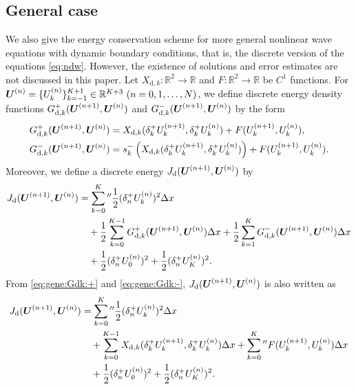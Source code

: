 \documentclass[dvipdfmx-if-dvi,autodetect-engine,ja=standard]{amsart}
\numberwithin{equation}{section} %
\def\vect#1{\mbox{\boldmath $#1$}} %
\begin{document}
\subsection{General case}
We also give the energy conservation scheme
for more general nonlinear wave equations
with dynamic boundary conditions,
that is, the discrete version of the equations \eqref{eq:ndw}.
However, the existence of solutions and
error estimates are not discussed in this paper.
Let
$X_{\mathrm{d},k}: \mathbb{R}^2 \to \mathbb{R}$
and
$F: \mathbb{R}^2 \to \mathbb{R}$
be $C^1$ functions.
For
$\vect{U}^{(n)} = \{ U_k^{(n)} \}_{k=-1}^{K+1} \in \mathbb{R}^{K+3} \ (n=0,1,\ldots,N)$,
we define
discrete energy density functions
$G_{\mathrm{d},k}^+ (\vect{U}^{(n+1)}, \vect{U}^{(n)})$
and
$G_{\mathrm{d},k}^- (\vect{U}^{(n+1)}, \vect{U}^{(n)})$
by the form
\begin{align}\label{eq:gene:Gdk:+}
    G_{\mathrm{d},k}^+ (\vect{U}^{(n+1)}, \vect{U}^{(n)})
    &= X_{\mathrm{d},k}(\delta_k^+ U_k^{(n+1)}, \delta_k^+ U_k^{(n)}) + F(U_k^{(n+1)}, U_k^{(n)}),\\
\label{eq:gene:Gdk:-}
     G_{\mathrm{d},k}^- (\vect{U}^{(n+1)}, \vect{U}^{(n)})
    &= s_k^- \left( X_{\mathrm{d},k}(\delta_k^+ U_k^{(n+1)}, \delta_k^+ U_k^{(n)}) \right) + F(U_k^{(n+1)}, U_k^{(n)}).
\end{align}
Moreover, we define a discrete energy
$J_{\mathrm{d}}(\vect{U}^{(n+1)}, \vect{U}^{(n)})$
by
\begin{align}
    J_{\mathrm{d}}(\vect{U}^{(n+1)}, \vect{U}^{(n)})
    &= \sum_{k=0}^K{}'' \frac{1}{2} (\delta_n^+ U_k^{(n)})^2 \Delta x \\
    &\quad + 
    \frac{1}{2} \sum_{k=0}^{K-1}
    G_{\mathrm{d},k}^+(\vect{U}^{(n+1)}, \vect{U}^{(n)}) \Delta x
    + \frac{1}{2} \sum_{k=1}^K
    G_{\mathrm{d},k}^- (\vect{U}^{(n+1)}, \vect{U}^{(n)}) \Delta x \\
    &\quad
    + \frac{1}{2} (\delta_n^+ U_0^{(n)})^2
    + \frac{1}{2} (\delta_n^+ U_K^{(n)})^2.
\end{align}
From \eqref{eq:gene:Gdk:+} and \eqref{eq:gene:Gdk:-},
$J_{\mathrm{d}}(\vect{U}^{(n+1)}, \vect{U}^{(n)})$
is also written as
\begin{align}
    J_{\mathrm{d}}(\vect{U}^{(n+1)}, \vect{U}^{(n)})
    &=
    \sum_{k=0}^K{}'' \frac{1}{2} (\delta_n^+ U_k^{(n)})^2 \Delta x \\
    &\quad +
    \sum_{k=0}^{K-1} X_{\mathrm{d},k} (\delta_k^+ U_k^{(n+1)}, \delta_k^+ U_k^{(n)}) \Delta x
    + \sum_{k=0}^K{}'' F(U_k^{(n+1)}, U_k^{(n)}) \Delta x \\
    &\quad
    + \frac{1}{2} (\delta_n^+ U_0^{(n)})^2
    + \frac{1}{2} (\delta_n^+ U_K^{(n)})^2.
\end{align}
\end{document}

